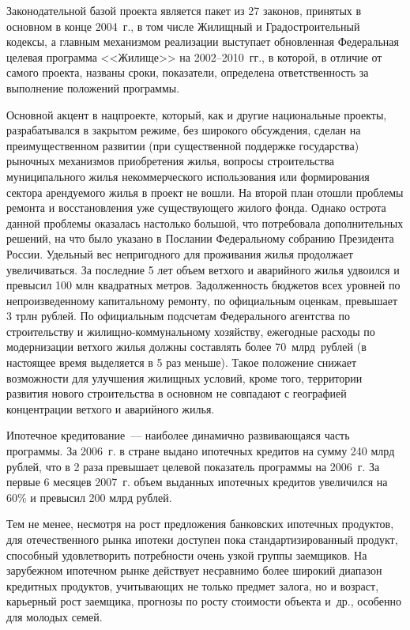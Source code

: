 \documentclass[article, 12pt, russian, oneside]{ncc}
\begin{document}
Законодательной базой проекта является пакет из 27 законов, принятых в
основном в конце 2004~г., в том числе Жилищный и Градостроительный
кодексы, а главным механизмом реализации выступает обновленная
Федеральная целевая программа <<Жилище>> на 2002--2010~гг., в которой,
в отличие от самого проекта, названы сроки, показатели, определена
ответственность за выполнение положений программы.

Основной акцент в нацпроекте, который, как и другие национальные
проекты, разрабатывался в закрытом режиме, без широкого обсуждения,
сделан на преимущественном развитии (при существенной поддержке
государства) рыночных механизмов приобретения жилья, вопросы
строительства муниципального жилья некоммерческого использования или
формирования сектора арендуемого жилья в проект не вошли. На второй
план отошли проблемы ремонта и восстановления уже существующего жилого
фонда. Однако острота данной проблемы оказалась настолько большой, что
потребовала дополнительных решений, на что было указано в Послании
Федеральному собранию Президента России. Удельный вес непригодного для
проживания жилья продолжает увеличиваться. За последние 5 лет объем
ветхого и аварийного жилья удвоился и превысил 100 млн квадратных
метров. Задолженность бюджетов всех уровней по непроизведенному
капитальному ремонту, по официальным оценкам, превышает 3 трлн
рублей. По официальным подсчетам Федерального агентства по
строительству и жилищно-коммунальному хозяйству, ежегодные расходы по
модернизации ветхого жилья должны составлять более 70~млрд~рублей (в
настоящее время выделяется в 5 раз меньше). Такое положение снижает
возможности для улучшения жилищных условий, кроме того, территории
развития нового строительства в основном не совпадают с географией
концентрации ветхого и аварийного жилья.
            
Ипотечное кредитование~--- наиболее динамично развивающаяся часть
программы. За 2006~г. в стране выдано ипотечных кредитов на сумму 240
млрд рублей, что в 2 раза превышает целевой показатель программы на
2006~г.  За первые 6 месяцев 2007~г. объем выданных ипотечных кредитов
увеличился на 60\% и превысил 200 млрд рублей.

Тем не менее, несмотря на рост предложения банковских ипотечных
продуктов, для отечественного рынка ипотеки доступен пока
стандартизированный продукт, способный удовлетворить потребности очень
узкой группы заемщиков. На зарубежном ипотечном рынке действует
несравнимо более широкий диапазон кредитных продуктов, учитывающих не
только предмет залога, но и возраст, карьерный рост заемщика, прогнозы
по росту стоимости объекта и~др., особенно для молодых семей.
                                                                                           
\end{document}
